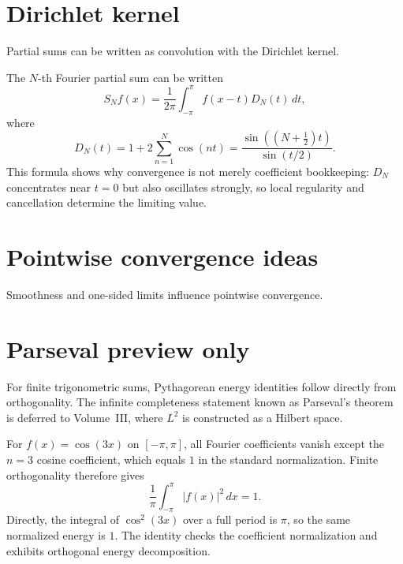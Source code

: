 \section{Dirichlet kernel}
Partial sums can be written as convolution with the Dirichlet kernel.


\begin{example}\label{ex:ii14-expand-02}
The \(N\)-th Fourier partial sum can be written
\[
S_Nf(x)=\frac1{2\pi}\int_{-\pi}^{\pi}f(x-t)D_N(t)\,dt,
\]
where
\[
D_N(t)=1+2\sum_{n=1}^N\cos(nt)
=\frac{\sin((N+\tfrac12)t)}{\sin(t/2)}.
\]
This formula shows why convergence is not merely coefficient bookkeeping:
\(D_N\) concentrates near \(t=0\) but also oscillates strongly, so local
regularity and cancellation determine the limiting value.
\end{example}
\section{Pointwise convergence ideas}
Smoothness and one-sided limits influence pointwise convergence.

\section{Parseval preview only}
For finite trigonometric sums, Pythagorean energy identities follow directly from orthogonality. The infinite completeness statement known as Parseval's theorem is deferred to Volume~III, where $L^2$ is constructed as a Hilbert space.


\begin{example}\label{ex:ii14-expand-03}
For \(f(x)=\cos(3x)\) on \([-\pi,\pi]\), all Fourier coefficients vanish except
the \(n=3\) cosine coefficient, which equals \(1\) in the standard
normalization. Finite orthogonality therefore gives
\[
\frac1\pi\int_{-\pi}^{\pi}|f(x)|^2\,dx=1.
\]
Directly, the integral of \(\cos^2(3x)\) over a full period is \(\pi\), so the
same normalized energy is \(1\). The identity checks the coefficient
normalization and exhibits orthogonal energy decomposition.
\end{example}
